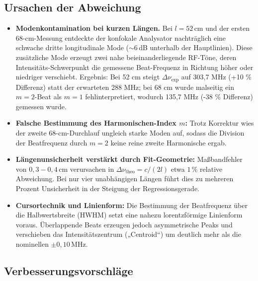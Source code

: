 \subsection*{Ursachen der Abweichung}

\begin{itemize}
  \item \textbf{Modenkontamination bei kurzen Längen.}  
    Bei \(l=52\,\mathrm{cm}\) und der ersten 68-cm-Messung entdeckte der konfokale Analysator nachträglich eine schwache dritte longitudinale Mode (\(\sim\!6\)\,dB unterhalb der Hauptlinien). Diese zusätzliche Mode erzeugt zwei nahe beieinanderliegende RF-Töne, deren Intensitäts-Schwerpunkt die gemessene Beat-Frequenz in Richtung höher oder niedriger verschiebt. Ergebnis: Bei 52 cm steigt \(\Delta\nu_{\mathrm{exp}}\) auf 303,7 MHz (+10 \% Differenz) statt der erwarteten 288 MHz; bei 68 cm wurde malseitig ein \(m=2\)-Beat als \(m=1\) fehlinterpretiert, wodurch 135,7 MHz (-38 \% Differenz) gemessen wurde.

  \item \textbf{Falsche Bestimmung des Harmonischen-Index \(m\):}  
    Trotz Korrektur wies der zweite 68-cm-Durchlauf ungleich starke Moden auf, sodass die Division der Beatfrequenz durch \(m = 2\) keine reine zweite Harmonische ergab.

  \item \textbf{Längenunsicherheit verstärkt durch Fit-Geometrie:}  
    Maßbandfehler von \(0{,}3{-}0{,}4\,\mathrm{cm}\) verursachen in \(\Delta\nu_{\mathrm{theo}} = c/(2l)\) etwa \(1\,\%\) relative Abweichung. 
    Bei nur vier unabhängigen Längen führt dies zu mehreren Prozent Unsicherheit in der Steigung der Regressionsgerade.

  \item \textbf{Cursortechnik und Linienform:}  
    Die Bestimmung der Beatfrequenz über die Halbwertsbreite (HWHM) setzt eine nahezu lorentzförmige Linienform voraus. 
    Überlappende Beats erzeugen jedoch asymmetrische Peaks und verschieben das Intensitätszentrum („Centroid“) um deutlich mehr als die nominellen \(\pm 0{,}10\,\mathrm{MHz}\).
\end{itemize}

\subsection*{Verbesserungsvorschläge}


